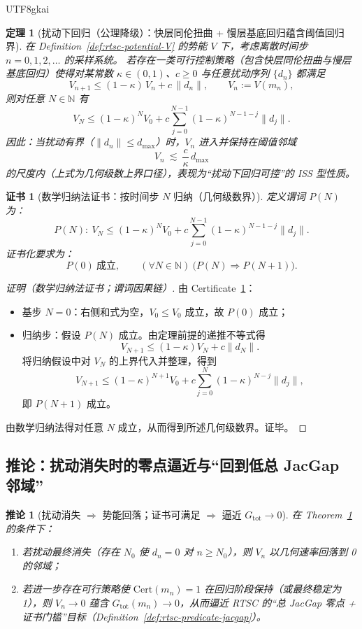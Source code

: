 \documentclass[12pt]{article}
\newtheorem{theorem}{定理}[section]
\newtheorem{corollary}{推论}[section]
\newtheorem{certificate}{证书}[section]
\newcommand{\RTSC}{\textsf{RTSC}}
\begin{document}
\begin{CJK*}{UTF8}{gkai}
\begin{theorem}[扰动下回归（公理降级）：快层同伦扭曲 + 慢层基底回归蕴含阈值回归界]
\label{thm:rtsc-disturbance-regression}
在 Definition~\ref{def:rtsc-potential-V} 的势能 $V$ 下，考虑离散时间步 $n=0,1,2,\dots$ 的采样系统。
若存在一类可行控制策略（包含快层同伦扭曲与慢层基底回归）使得对某常数 $\kappa\in(0,1)$、$c\ge 0$ 与任意扰动序列 $\{d_n\}$ 都满足
\[
V_{n+1}\le (1-\kappa)\,V_n + c\,\|d_n\|,
\qquad V_n:=V(m_n),
\]
则对任意 $N\in\mathbb{N}$ 有
\[
V_N\le (1-\kappa)^N V_0 + c\sum_{j=0}^{N-1}(1-\kappa)^{N-1-j}\|d_j\|.
\]
因此：当扰动有界（$\|d_n\|\le d_{\max}$）时，$V_n$ 进入并保持在阈值邻域
\[
V_n\ \lesssim\ \frac{c}{\kappa}\,d_{\max}
\]
的尺度内（上式为几何级数上界口径），表现为“扰动下回归可控”的 ISS 型性质。
\end{theorem}

\begin{certificate}[数学归纳法证书：按时间步 $N$ 归纳（几何级数界）]
\label{cert:rtsc-disturbance-regression-induction}
定义谓词 $P(N)$ 为：
\[
P(N):\ V_N\le (1-\kappa)^N V_0 + c\sum_{j=0}^{N-1}(1-\kappa)^{N-1-j}\|d_j\|.
\]
证书化要求为：
\[
P(0)\ \text{成立},\qquad (\forall N\in\mathbb{N})\ \bigl(P(N)\Rightarrow P(N+1)\bigr).
\]
\end{certificate}

\begin{proof}[证明（数学归纳法证书；谓词因果链）]
由 Certificate~\ref{cert:rtsc-disturbance-regression-induction}：
\begin{itemize}
  \item 基步 $N=0$：右侧和式为空，$V_0\le V_0$ 成立，故 $P(0)$ 成立；
  \item 归纳步：假设 $P(N)$ 成立。由定理前提的递推不等式得
  \[
  V_{N+1}\le (1-\kappa)V_N + c\|d_N\|.
  \]
  将归纳假设中对 $V_N$ 的上界代入并整理，得到
  \[
  V_{N+1}\le (1-\kappa)^{N+1}V_0 + c\sum_{j=0}^{N}(1-\kappa)^{N-j}\|d_j\|,
  \]
  即 $P(N+1)$ 成立。
\end{itemize}
由数学归纳法得对任意 $N$ 成立，从而得到所述几何级数界。证毕。
\end{proof}

\subsection{推论：扰动消失时的零点逼近与“回到低总 JacGap 邻域”}

\begin{corollary}[扰动消失 $\Rightarrow$ 势能回落；证书可满足 $\Rightarrow$ 逼近 $G_{\mathrm{tot}}\to 0$]
\label{cor:rtsc-disturbance-vanish}
在 Theorem~\ref{thm:rtsc-disturbance-regression} 的条件下：
\begin{enumerate}
  \item 若扰动最终消失（存在 $N_0$ 使 $d_n=0$ 对 $n\ge N_0$），则 $V_n$ 以几何速率回落到 0 的邻域；
  \item 若进一步存在可行策略使 $\mathrm{Cert}(m_n)=1$ 在回归阶段保持（或最终稳定为 1），则 $V_n\to 0$ 蕴含 $G_{\mathrm{tot}}(m_n)\to 0$，从而逼近 \RTSC{}
    的“总 JacGap 零点 + 证书门槛”目标（Definition~\ref{def:rtsc-predicate-jacgap}）。
\end{enumerate}
\end{corollary}


\end{CJK*}
\end{document}
